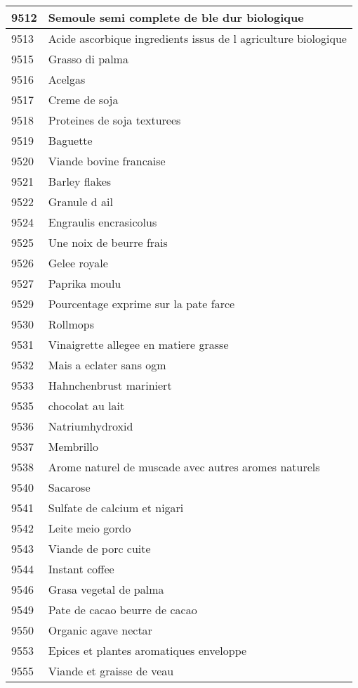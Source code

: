 \begin{longtable}{|l|l|}
9512 & Semoule semi complete de ble dur biologique \\ \hline 
9513 & Acide ascorbique ingredients issus de l agriculture biologique \\ \hline 
9515 & Grasso di palma \\ \hline 
9516 & Acelgas \\ \hline 
9517 & Creme de soja \\ \hline 
9518 & Proteines de soja texturees \\ \hline 
9519 & Baguette \\ \hline 
9520 & Viande bovine francaise \\ \hline 
9521 & Barley flakes \\ \hline 
9522 & Granule d ail \\ \hline 
9524 & Engraulis encrasicolus \\ \hline 
9525 & Une noix de beurre frais \\ \hline 
9526 & Gelee royale \\ \hline 
9527 & Paprika moulu \\ \hline 
9529 & Pourcentage exprime sur la pate farce \\ \hline 
9530 & Rollmops \\ \hline 
9531 & Vinaigrette allegee en matiere grasse \\ \hline 
9532 & Mais a eclater sans ogm \\ \hline 
9533 & Hahnchenbrust mariniert \\ \hline 
9535 & chocolat au lait \\ \hline 
9536 & Natriumhydroxid \\ \hline 
9537 & Membrillo \\ \hline 
9538 & Arome naturel de muscade avec autres aromes naturels \\ \hline 
9540 & Sacarose \\ \hline 
9541 & Sulfate de calcium et nigari \\ \hline 
9542 & Leite meio gordo \\ \hline 
9543 & Viande de porc cuite \\ \hline 
9544 & Instant coffee \\ \hline 
9546 & Grasa vegetal de palma \\ \hline 
9549 & Pate de cacao beurre de cacao \\ \hline 
9550 & Organic agave nectar \\ \hline 
9553 & Epices et plantes aromatiques enveloppe \\ \hline 
9555 & Viande et graisse de veau \\ \hline 

\end{longtable}
